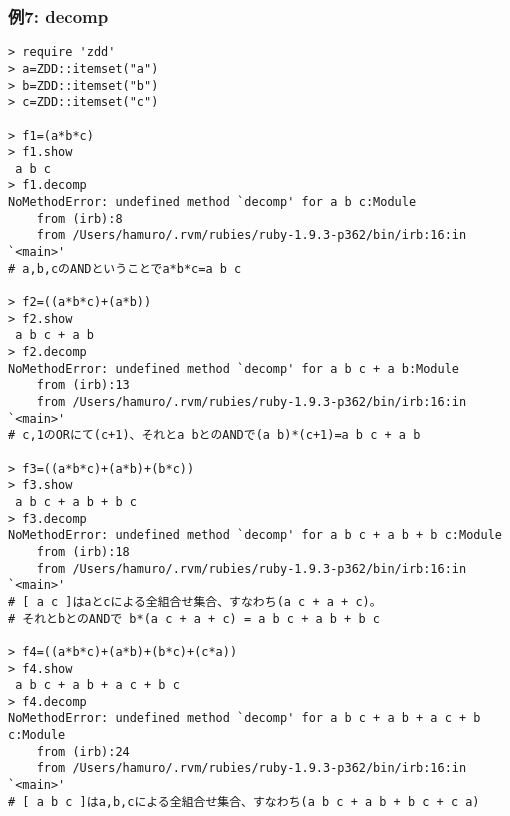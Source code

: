 \subsubsection*{例7: decomp}



\begin{Verbatim}[baselinestretch=0.7,frame=single]
> require 'zdd'
> a=ZDD::itemset("a")
> b=ZDD::itemset("b")
> c=ZDD::itemset("c")

> f1=(a*b*c)
> f1.show
 a b c
> f1.decomp
NoMethodError: undefined method `decomp' for a b c:Module
	from (irb):8
	from /Users/hamuro/.rvm/rubies/ruby-1.9.3-p362/bin/irb:16:in `<main>'
# a,b,cのANDということでa*b*c=a b c

> f2=((a*b*c)+(a*b))
> f2.show
 a b c + a b
> f2.decomp
NoMethodError: undefined method `decomp' for a b c + a b:Module
	from (irb):13
	from /Users/hamuro/.rvm/rubies/ruby-1.9.3-p362/bin/irb:16:in `<main>'
# c,1のORにて(c+1)、それとa bとのANDで(a b)*(c+1)=a b c + a b

> f3=((a*b*c)+(a*b)+(b*c))
> f3.show
 a b c + a b + b c
> f3.decomp
NoMethodError: undefined method `decomp' for a b c + a b + b c:Module
	from (irb):18
	from /Users/hamuro/.rvm/rubies/ruby-1.9.3-p362/bin/irb:16:in `<main>'
# [ a c ]はaとcによる全組合せ集合、すなわち(a c + a + c)。
# それとbとのANDで b*(a c + a + c) = a b c + a b + b c

> f4=((a*b*c)+(a*b)+(b*c)+(c*a))
> f4.show
 a b c + a b + a c + b c
> f4.decomp
NoMethodError: undefined method `decomp' for a b c + a b + a c + b c:Module
	from (irb):24
	from /Users/hamuro/.rvm/rubies/ruby-1.9.3-p362/bin/irb:16:in `<main>'
# [ a b c ]はa,b,cによる全組合せ集合、すなわち(a b c + a b + b c + c a)

\end{Verbatim}
